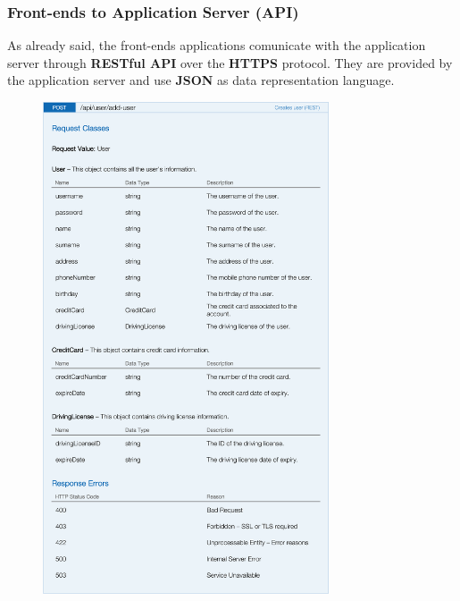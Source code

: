 \subsubsection{Front-ends to Application Server (API)}

As already said, the front-ends applications comunicate with the application server through \textbf{RESTful API} over the \textbf{HTTPS} protocol. They are provided by the application server and use \textbf{JSON} as data representation language.

\begin{figure}[H]
	\noindent
    	\centering
    	\includegraphics[height=550px, keepaspectratio]{apitables/APIAddUser.png}
    	\label{fig:api-add-user}
\end{figure}


